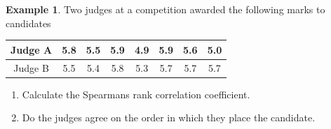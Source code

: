 \documentclass[11pt,a4paper]{article}
\theoremstyle{definition}
\newtheorem{example}[thm]{Example}
\begin{document}
\begin{example}
Two judges at a competition awarded the following marks to candidates
\begin{table}[H]
\centering
\begin{tabular}{c|ccccccc}
Judge A&5.8&5.5&5.9&4.9&5.9&5.6&5.0\\
\hline Judge B&5.5&5.4&5.8&5.3&5.7&5.7&5.7\\
\end{tabular}
\end{table}


\begin{enumerate}
\item Calculate the Spearmans rank correlation coefficient.
\item Do the judges agree on the order in which they place the candidate.\\
\end{enumerate}
\end{example}
\end{document}
